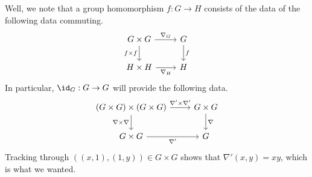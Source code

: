 Well, we note that a group homomorphism $f:G\to H$ consists of the data of the following data commuting.
\[\begin{tikzcd}
	{G\times G} & G \\
	{H\times H} & H
	\arrow["{f\times f}"', from=1-1, to=2-1]
	\arrow["f", from=1-2, to=2-2]
	\arrow["{\nabla_G}", from=1-1, to=1-2]
	\arrow["{\nabla_H}"', from=2-1, to=2-2]
\end{tikzcd}\]
In particular, $\id_G:G\to G$ will provide the following data.
\[\begin{tikzcd}
	{(G\times G)\times(G\times G)} & {G\times G} \\
	{G\times G} & G
	\arrow["\nabla\times\nabla"', from=1-1, to=2-1]
	\arrow["{\nabla'\times\nabla'}", from=1-1, to=1-2]
	\arrow["\nabla", from=1-2, to=2-2]
	\arrow["{\nabla'}"', from=2-1, to=2-2]
\end{tikzcd}\]
Tracking through $((x,1),(1,y))\in G\times G$ shows that $\nabla'(x,y)=xy$, which is what we wanted.